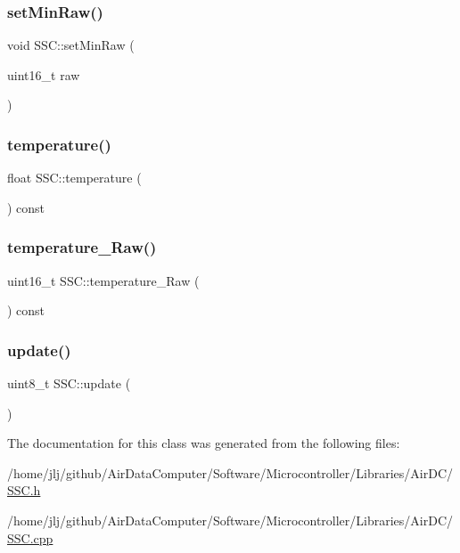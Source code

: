 \subsubsection{\texorpdfstring{set\+Min\+Raw()}{setMinRaw()}}
{\footnotesize\ttfamily void S\+S\+C\+::set\+Min\+Raw (\begin{DoxyParamCaption}\item[{uint16\+\_\+t}]{raw }\end{DoxyParamCaption})\hspace{0.3cm}{\ttfamily [inline]}}

\mbox{\label{class_s_s_c_a30d005252723ae8ad7aa6806677172e1}} 
\subsubsection{\texorpdfstring{temperature()}{temperature()}}
{\footnotesize\ttfamily float S\+S\+C\+::temperature (\begin{DoxyParamCaption}{ }\end{DoxyParamCaption}) const\hspace{0.3cm}{\ttfamily [inline]}}

\mbox{\label{class_s_s_c_a957056a2bd3932ca7a812af8f41f0718}} 
\subsubsection{\texorpdfstring{temperature\+\_\+\+Raw()}{temperature\_Raw()}}
{\footnotesize\ttfamily uint16\+\_\+t S\+S\+C\+::temperature\+\_\+\+Raw (\begin{DoxyParamCaption}{ }\end{DoxyParamCaption}) const\hspace{0.3cm}{\ttfamily [inline]}}

\mbox{\label{class_s_s_c_a4eb4e0d9d5f45fd3f37cf0e22c894117}} 
\subsubsection{\texorpdfstring{update()}{update()}}
{\footnotesize\ttfamily uint8\+\_\+t S\+S\+C\+::update (\begin{DoxyParamCaption}{ }\end{DoxyParamCaption})}



The documentation for this class was generated from the following files\+:\begin{DoxyCompactItemize}
\item 
/home/jlj/github/\+Air\+Data\+Computer/\+Software/\+Microcontroller/\+Libraries/\+Air\+D\+C/\hyperlink{_s_s_c_8h}{S\+S\+C.\+h}\item 
/home/jlj/github/\+Air\+Data\+Computer/\+Software/\+Microcontroller/\+Libraries/\+Air\+D\+C/\hyperlink{_s_s_c_8cpp}{S\+S\+C.\+cpp}\end{DoxyCompactItemize}
